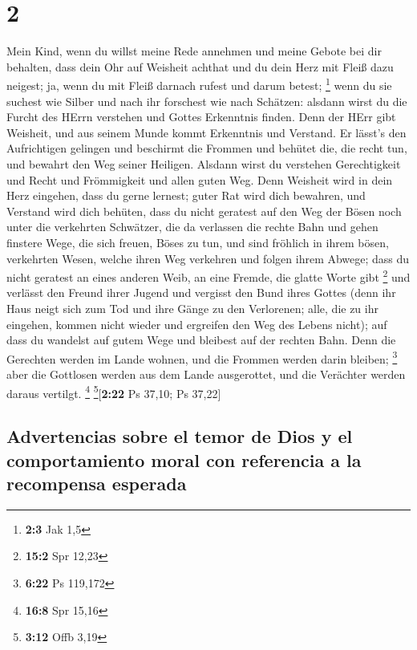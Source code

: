 \hypertarget{section-1}{%
\section{2}\label{section-1}}

 Mein Kind, wenn du willst meine Rede annehmen und meine
Gebote bei dir behalten,  dass dein Ohr auf Weisheit
achthat und du dein Herz mit Fleiß dazu neigest;  ja, wenn
du mit Fleiß darnach rufest und darum betest; \footnote{\textbf{2:3} Jak
  1,5}  wenn du sie suchest wie Silber und nach ihr
forschest wie nach Schätzen:  alsdann wirst du die Furcht
des HErrn verstehen und Gottes Erkenntnis finden.  Denn
der HErr gibt Weisheit, und aus seinem Munde kommt Erkenntnis und
Verstand.  Er lässt's den Aufrichtigen gelingen und
beschirmt die Frommen  und behütet die, die recht tun, und
bewahrt den Weg seiner Heiligen.  Alsdann wirst du
verstehen Gerechtigkeit und Recht und Frömmigkeit und allen guten Weg.
 Denn Weisheit wird in dein Herz eingehen, dass du gerne
lernest;  guter Rat wird dich bewahren, und Verstand wird
dich behüten,  dass du nicht geratest auf den Weg der
Bösen noch unter die verkehrten Schwätzer,  die da
verlassen die rechte Bahn und gehen finstere Wege,  die
sich freuen, Böses zu tun, und sind fröhlich in ihrem bösen, verkehrten
Wesen,  welche ihren Weg verkehren und folgen ihrem
Abwege;  dass du nicht geratest an eines anderen Weib, an
eine Fremde, die glatte Worte gibt \footnote{\textbf{15:2} Spr 12,23}
 und verlässt den Freund ihrer Jugend und vergisst den
Bund ihres Gottes  (denn ihr Haus neigt sich zum Tod und
ihre Gänge zu den Verlorenen;  alle, die zu ihr eingehen,
kommen nicht wieder und ergreifen den Weg des Lebens nicht);
 auf dass du wandelst auf gutem Wege und bleibest auf der
rechten Bahn.  Denn die Gerechten werden im Lande wohnen,
und die Frommen werden darin bleiben; \footnote{\textbf{6:22} Ps 119,172}
 aber die Gottlosen werden aus dem Lande ausgerottet, und
die Verächter werden daraus vertilgt. \footnote{\textbf{16:8} Spr 15,16}
\footnote{\textbf{3:12} Offb 3,19}{[}\textbf{2:22} Ps 37,10; Ps 37,22{]}

\hypertarget{advertencias-sobre-el-temor-de-dios-y-el-comportamiento-moral-con-referencia-a-la-recompensa-esperada}{%
\subsection{Advertencias sobre el temor de Dios y el comportamiento
moral con referencia a la recompensa
esperada}\label{advertencias-sobre-el-temor-de-dios-y-el-comportamiento-moral-con-referencia-a-la-recompensa-esperada}}

